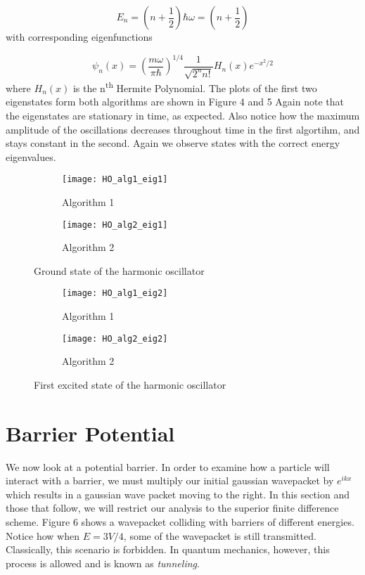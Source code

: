 \documentclass{article}
\begin{document}
\begin{equation}
E_n =  \left( n + \frac{1}{2} \right) \hbar \omega = \left( n + \frac{1}{2} \right)
\end{equation}
%
with corresponding eigenfunctions

\begin{equation}
\psi_n(x) = \left( \frac{m \omega}{\pi \hbar} \right)^{1/4} \frac{1}{\sqrt{2^n n!}} H_n(x)e^{-x^2/2}
\end{equation}
%
where $H_n(x)$ is the n\textsuperscript{th}  Hermite Polynomial. The plots of the first two eigenstates form both algorithms are shown in Figure 4 and 5
Again note that the eigenstates are stationary in time, as expected. Also notice how the maximum amplitude of the oscillations decreases throughout time in the first algortihm, and stays constant in the second. Again we observe states with the correct energy eigenvalues.

\begin{figure}
\centering
\begin{subfigure}[h!]{0.3\textwidth}
\centering
\texttt{[image: HO\_alg1\_eig1]}
\caption{Algorithm 1}
\end{subfigure}
%
\begin{subfigure}[h!]{0.3\textwidth}
\centering
\texttt{[image: HO\_alg2\_eig1]}
\caption{Algorithm 2}
\end{subfigure}

\caption{Ground state of the harmonic oscillator}
\end{figure}

\begin{figure}
\centering
\begin{subfigure}[h!]{0.3\textwidth}
\centering
\texttt{[image: HO\_alg1\_eig2]}
\caption{Algorithm 1}
\end{subfigure}
%
\begin{subfigure}[h!]{0.3\textwidth}
\centering
\texttt{[image: HO\_alg2\_eig2]}
\caption{Algorithm 2}
\end{subfigure}

\caption{First excited state of the harmonic oscillator}
\end{figure}

\section{Barrier Potential}

We now look at a potential barrier. In order to examine how a particle will interact with a barrier, we must multiply our initial gaussian wavepacket 
by $e^{ikx}$ which results in a gaussian wave packet moving to the right. In this section and those that follow, we will restrict our analysis to the superior finite difference scheme. Figure 6 shows a wavepacket colliding with barriers of different energies. Notice how when $ E = 3V/4 $, some of the wavepacket is still transmitted. Classically, this scenario is forbidden. In quantum mechanics, however, this process is allowed and is known as {\it tunneling}. 
\end{document}
